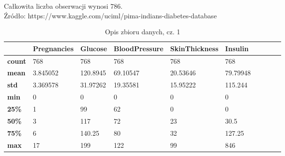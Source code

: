 \documentclass[12pt]{article}
\begin{document}
Całkowita liczba obserwacji wynosi 786.\\

Źródło: https://www.kaggle.com/uciml/pima-indians-diabetes-database


\begin{table}[]
	\caption{Opis zbioru danych, cz. 1}
	\label{table:opis}
	\begin{tabular}{@{}llllllllll@{}}
		\toprule
		               & \textbf{Pregnancies} & \textbf{Glucose} & \textbf{BloodPressure} & \textbf{SkinThickness} & \textbf{Insulin} &   &   &   &   \\ \midrule
		\textbf{count} & 768                  & 768              & 768                    & 768                    & 768              &   &   &   &   \\
		\textbf{mean}  & 3.845052             & 120.8945         & 69.10547               & 20.53646               & 79.79948         &   &   &   &   \\
		\textbf{std}   & 3.369578             & 31.97262         & 19.35581               & 15.95222               & 115.244          &   &   &   &   \\
		\textbf{min}   & 0                    & 0                & 0                      & 0                      & 0                &   &   &   &   \\
		\textbf{25\%}  & 1                    & 99               & 62                     & 0                      & 0                &   &   &   &   \\
		\textbf{50\%}  & 3                    & 117              & 72                     & 23                     & 30.5             &   &   &   &   \\
		\textbf{75\%}  & 6                    & 140.25           & 80                     & 32                     & 127.25           &   &   &   &   \\
		\textbf{max}   & 17                   & 199              & 122                    & 99                     & 846              &   &   &   &   \\ \bottomrule
		
	\end{tabular}
\end{table}
\end{document}
